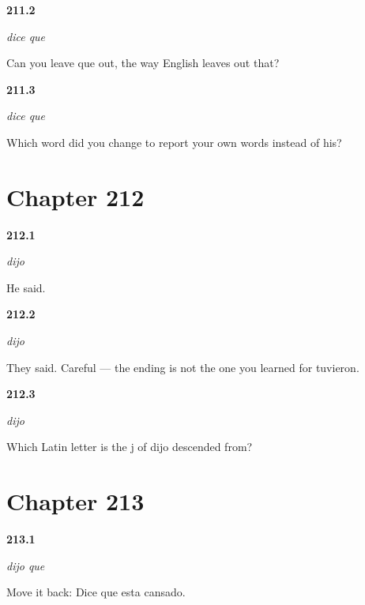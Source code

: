 \noindent\begin{minipage}[t]{\linewidth}
\raggedright
\hypertarget{review-ES-C57-dice-que-drop}{\textbf{211.2}} \emph{dice que}\par
\small Can you leave que out, the way English leaves out that?
\end{minipage}\par\medskip

\noindent\begin{minipage}[t]{\linewidth}
\raggedright
\hypertarget{review-ES-C57-dice-que-echo}{\textbf{211.3}} \emph{dice que}\par
\small Which word did you change to report your own words instead of his?
\end{minipage}\par\medskip

\section*{Chapter 212}

\noindent\begin{minipage}[t]{\linewidth}
\raggedright
\hypertarget{review-ES-C57-dijo-say}{\textbf{212.1}} \emph{dijo}\par
\small He said.
\end{minipage}\par\medskip

\noindent\begin{minipage}[t]{\linewidth}
\raggedright
\hypertarget{review-ES-C57-dijo-plural}{\textbf{212.2}} \emph{dijo}\par
\small They said. Careful — the ending is not the one you learned for tuvieron.
\end{minipage}\par\medskip

\noindent\begin{minipage}[t]{\linewidth}
\raggedright
\hypertarget{review-ES-C57-dijo-letter}{\textbf{212.3}} \emph{dijo}\par
\small Which Latin letter is the j of dijo descended from?
\end{minipage}\par\medskip

\section*{Chapter 213}

\noindent\begin{minipage}[t]{\linewidth}
\raggedright
\hypertarget{review-ES-C57-dijo-que-shift}{\textbf{213.1}} \emph{dijo que}\par
\small Move it back: Dice que esta cansado.
\end{minipage}\par\medskip

